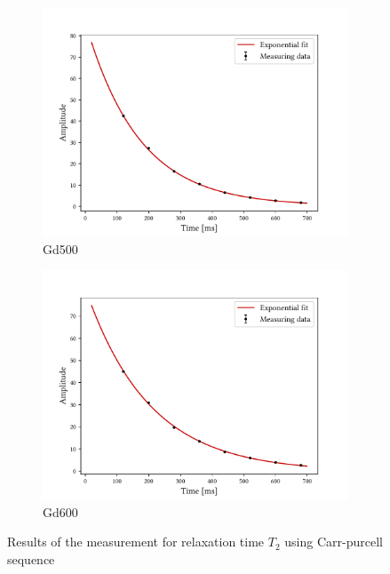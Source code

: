 \begin{figure}[ht]
\begin{subfigure}{.45\textwidth}
\includegraphics[width=9.3cm]{..//figures//f61_abb_3.pdf}
\caption{Gd500}
\end{subfigure}
\qquad
\begin{subfigure}{.45\textwidth}
\includegraphics[width=9.3cm]{..//figures//f61_abb_3_600.pdf}
\caption{Gd600}
\end{subfigure}
\caption{Results of the measurement for relaxation time $T_2$ using Carr-purcell sequence}
\label{fig:t2cp}
\end{figure}




